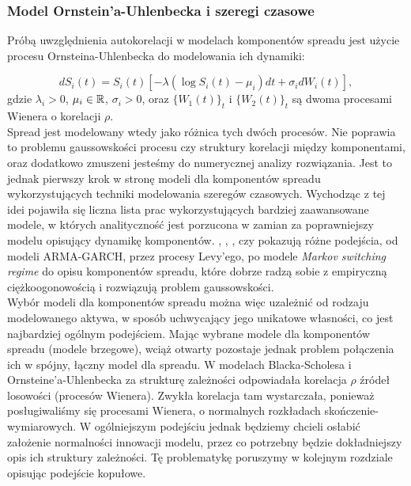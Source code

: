 \subsubsection{Model Ornstein'a-Uhlenbecka i szeregi czasowe}

Próbą uwzględnienia autokorelacji w modelach komponentów spreadu jest użycie procesu Ornsteina-Uhlenbecka do modelowania ich dynamiki:

$$ dS_i(t) =S_i(t)[-\lambda (\log S_i(t) - \mu_i)dt + \sigma_i dW_i(t)],$$
gdzie $\lambda_i>0$,  $\mu_i \in \mathbb{R}$, $\sigma_i >0$, oraz $\{W_1(t)\}_t$ i $\{W_2(t)\}_t$ są dwoma procesami Wienera o korelacji $\rho$.\\

Spread jest modelowany wtedy jako różnica tych dwóch procesów. Nie poprawia to problemu gaussowskości procesu czy struktury korelacji między komponentami, oraz dodatkowo zmuszeni jesteśmy do numerycznej analizy rozwiązania. Jest to jednak pierwszy krok w stronę modeli dla komponentów spreadu wykorzystujących techniki modelowania szeregów czasowych. Wychodząc z tej idei pojawiła się liczna lista prac wykorzystujących bardziej zaawansowane modele, w których analityczność jest porzucona w zamian za poprawniejszy modelu opisujący dynamikę komponentów. \cite{Herath_Copula_Crack_Spread}, \cite{Eyigungor_Markov_Spreads}, \cite{Espen_Crack_Spread_Copula}, czy \cite{Bernard_Pricing_Multivariate_Options_with_copulae} pokazują różne podejścia, od modeli ARMA-GARCH, przez procesy Levy'ego, po modele \emph{Markov switching regime} do opisu komponentów spreadu, które dobrze radzą sobie z empiryczną ciężkoogonowością i rozwiązują problem gaussowskości.\\

Wybór modeli dla komponentów spreadu można więc uzależnić od rodzaju modelowanego aktywa, w sposób uchwycający jego unikatowe własności, co jest najbardziej ogólnym podejściem. Mając wybrane modele dla komponentów spreadu (modele brzegowe), wciąż otwarty pozostaje jednak problem połączenia ich w spójny, łączny model dla spreadu. W modelach Blacka-Scholesa i Ornsteine'a-Uhlenbecka za strukturę zależności odpowiadała korelacja $\rho$ źródeł losowości (procesów Wienera). Zwykła korelacja tam wystarczała, ponieważ posługiwaliśmy się procesami Wienera, o normalnych rozkładach skończenie-wymiarowych. W ogólniejszym podejściu jednak będziemy chcieli osłabić założenie normalności innowacji modelu, przez co potrzebny będzie dokładniejszy opis ich struktury zależności. Tę problematykę poruszymy w kolejnym rozdziale opisując podejście kopułowe.